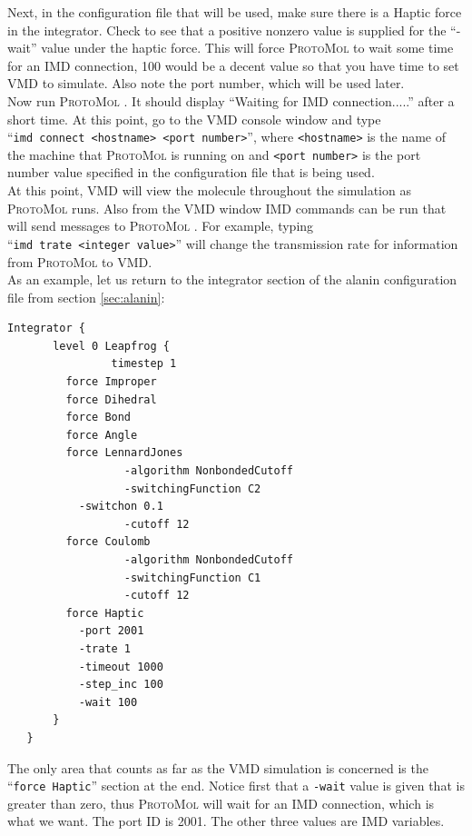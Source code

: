 \documentclass[11pt]{report}
\newcommand{\ProtoMol}{\textsc{ProtoMol }}
\providecommand{\ttsmall}[1]{\texttt{\small\mbox{#1}}}
\begin{document}
Next, in the configuration file that will be used, make sure there is
a Haptic force in the integrator.  Check to see that a positive
nonzero value is supplied for the ``-wait'' value under the haptic
force.  This will force \ProtoMol to wait some time for an IMD
connection, 100 would be a decent value so that you have time to set
VMD to simulate.  Also note the port number, which will be used
later.\\

Now run \ProtoMol.  It should display ``Waiting for IMD
connection.....'' after a short time.  At this point, go to the VMD
console window and type ``\ttsmall{imd connect <hostname> <port
number>}'', where \ttsmall{<hostname>} is the name of the
machine that \ProtoMol is running on and \ttsmall{<port number>}
is the port number value specified in the configuration file that is
being used.\\

At this point, VMD will view the molecule throughout the simulation as
\ProtoMol runs.  Also from the VMD window IMD commands can be run that
will send messages to \ProtoMol.  For example, typing\\ ``\ttsmall{imd
trate <integer value>}'' will change the transmission rate for
information from \ProtoMol to VMD.\\

As an example, let us return to the integrator section of the alanin configuration file from section \ref{sec:alanin}:\\

\begin{verbatim}        
Integrator {
       level 0 Leapfrog {
                timestep 1
         force Improper 
         force Dihedral
         force Bond
         force Angle 
         force LennardJones
                  -algorithm NonbondedCutoff
                  -switchingFunction C2
           -switchon 0.1
                  -cutoff 12
         force Coulomb
                  -algorithm NonbondedCutoff
                  -switchingFunction C1
                  -cutoff 12
         force Haptic
           -port 2001
           -trate 1
           -timeout 1000
           -step_inc 100
           -wait 100
       }
   }
\end{verbatim}        

The only area that counts as far as the VMD simulation is concerned is
the ``\ttsmall{force Haptic}'' section at the end.  Notice first that
a \ttsmall{-wait} value is given that is greater than zero, thus
\ProtoMol will wait for an IMD connection, which is what we want.  The
port ID is 2001.  The other three values are IMD variables. \\ 
\end{document}
